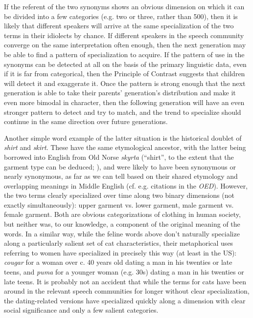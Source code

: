 If the referent of the two synonyms shows an obvious dimension on which it can be divided into a few categories (e.g. two or three, rather than 500), then it is likely that different speakers will arrive at the same specialization of the two terms in their idiolects by chance.
If different speakers in the speech community converge on the same interpretation often enough, then the next generation may be able to find a pattern of specialization to acquire.
If the pattern of use in the synonyms can be detected at all on the basis of the primary linguistic data, even if it is far from categorical, then the Principle of Contrast suggests that children will detect it and exaggerate it.
Once the pattern is strong enough that the next generation is able to take their parents' generation's distribution and make it even more bimodal in character, then the following generation will have an even stronger pattern to detect and try to match, and the trend to specialize should continue in the same direction over future generations.

Another simple word example of the latter situation is the historical doublet of \textsl{shirt} and \textsl{skirt}.
These have the same etymological ancestor, with the latter being borrowed into English from Old Norse \textsl{skyrta} (``shirt'', to the extent that the garment type can be deduced; \citealt{cleasbyvigfusson}), and were likely to have been synonymous or nearly synonymous, as far as we can tell based on their shared etymology and overlapping meanings in Middle English (cf. e.g. citations in the \textsl{OED}).
However, the two terms clearly specialized over time along two binary dimensions (not exactly simultaneously): upper garment vs. lower garment, male garment vs. female garment.
Both are obvious categorizations of clothing in human society, but neither was, to our knowledge, a component of the original meaning of the words.
In a similar way, while the feline words above don't naturally specialize along a particularly salient set of cat characteristics, their metaphorical uses referring to women have specialized in precisely this way (at least in the US): \textsl{cougar} for a woman over c. 40 years old dating a man in his twenties or late teens, and \textsl{puma} for a younger woman (e.g. 30s) dating a man in his twenties or late teens.
It is probably not an accident that while the terms for cats have been around in the relevant speech communities for longer without clear specialization, the dating-related versions have specialized quickly along a dimension with clear social significance and only a few salient categories.

